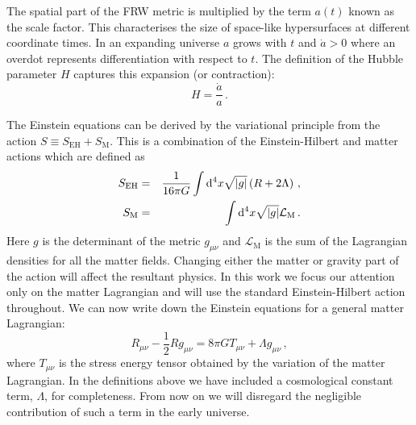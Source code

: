 The spatial part of the FRW metric is multiplied by the term $a(t)$ known as the
scale factor. This characterises the size of space-like hypersurfaces at
different coordinate times. In an expanding universe $a$ grows with $t$ and
$\dot{a}>0$ where an overdot represents differentiation with respect to $t$.
The definition of the Hubble parameter $H$ captures this expansion (or
contraction):
\begin{equation}
 \label{eq:Hdefn-intro}
  H = \frac{\dot{a}}{a} \,.
\end{equation}
%


The Einstein equations can be derived by the variational principle from the
action $S\equiv S_\mathrm{EH} + S_\mathrm{M}$. This is a combination of the
Einstein-Hilbert and matter actions which are defined as 
% 
\begin{eqnarray}
\label{eq:EHeqn-intro}
 S_\mathrm{EH} &=& \frac{1}{16\pi G}\int \mathrm{d}^4 x \sqrt{|g|} \left(R +
2\Lambda\right) \,,\\
\label{eq:matteraction-intro}
 S_\mathrm{M} &=& \int \mathrm{d}^4 x \sqrt{|g|}
\mathcal{L}_\mathrm{M} \,.
\end{eqnarray}
% 
Here $g$ is the determinant of the metric $g_{\mu\nu}$
and $\mathcal{L}_\mathrm{M}$ is the sum of the Lagrangian densities
for all the matter fields.
Changing either the matter or gravity part of the action will affect the
resultant physics. In this work we focus our attention only on the matter
Lagrangian and will use the standard Einstein-Hilbert action throughout.
We can now write down the Einstein equations for a general matter Lagrangian:
% 
\begin{equation}
\label{eq:einstein-intro}
 R_{\mu\nu} - \frac{1}{2}R g_{\mu\nu} = 8\pi G T_{\mu\nu} + \Lambda
g_{\mu\nu}\,,
\end{equation}
% 
where $T_{\mu\nu}$ is the stress energy tensor obtained by the variation of the
matter Lagrangian. 
In the definitions above we have included a
cosmological constant term, $\Lambda$, for completeness. From now on we will
disregard the negligible contribution of such a term in the early universe.


